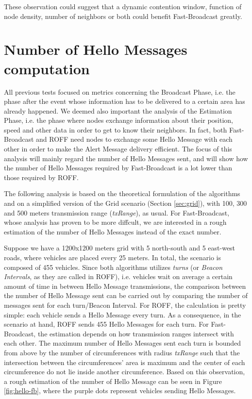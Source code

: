 		
		These observation could suggest that a dynamic contention window, function of node density, number of neighbors or both could benefit Fast-Broadcast greatly.
		
	\section{Number of Hello Messages computation}
		All previous tests focused on metrics concerning the Broadcast Phase, i.e. the phase after the event whose information has to be delivered to a certain area has already happened. We deemed also important the analysis of the Estimation Phase, i.e. the phase where nodes exchange information about their position, speed and other data in order to get to know their neighbors. In fact, both Fast-Broadcast and ROFF need nodes to exchange some Hello Message with each other in order to make the Alert Message delivery efficient. The focus of this analysis will mainly regard the number of Hello Messages sent, and will show how the number of Hello Messages required by Fast-Broadcast is a lot lower than those required by ROFF. 
		
		The following analysis is based on the theoretical formulation of the algorithms and on a simplified version of the Grid scenario (Section \ref{sec:grid}), with 100, 300 and 500 meters transmission range (\textit{txRange}), as usual.  For Fast-Broadcast, whose analysis has proven to be more diffcult, we are interested in a rough estimation of the number of Hello Messages instead of the exact number. 
		
		Suppose we have a 1200x1200 meters grid with 5 north-south and 5 east-west roads, where vehicles are placed every 25 meters. In total, the scenario is composed of 455 vehicles. Since both algorithms utilizes \textit{turns} (or \textit{Beacon Intervals}, as they are called in ROFF), i.e. vehicles wait on average a certain amount of time in between Hello Message transmissions, the comparison between the number of Hello Message sent can be carried out by comparing the number of messages sent for each turn/Beacon Interval. For ROFF, the calculation is pretty simple: each vehicle sends a Hello Message every turn. As a consequence, in the scenario at hand, ROFF sends 455 Hello Messages for each turn. For Fast-Broadcast, the estimation depends on how transmission ranges intersect with each other. The maximum number of Hello Messages sent each turn is bounded from above by the number of circumferences with radius \textit{txRange} such that the intersection between the circumferences' area is maximum and the center of each circumference do not lie inside another circumference. Based on this observation, a rough estimation of the number of Hello Message can be seen in Figure \ref{fig:hello-fb}, where the purple dots represent vehicles sending Hello Messages.
		
